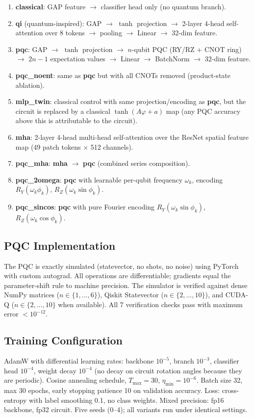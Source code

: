 \documentclass[conference]{IEEEtran}
\begin{document}
\begin{enumerate}
\item \textbf{classical}: GAP feature $\to$ classifier head only (no quantum branch).
\item \textbf{qi} (quantum-inspired): GAP $\to$ $\tanh$ projection $\to$ 2-layer 4-head self-attention over 8 tokens $\to$ pooling $\to$ Linear $\to$ 32-dim feature.
\item \textbf{pqc}: GAP $\to$ $\tanh$ projection $\to$ $n$-qubit PQC (RY/RZ + CNOT ring) $\to$ $2n-1$ expectation values $\to$ Linear $\to$ BatchNorm $\to$ 32-dim feature.
\item \textbf{pqc\_noent}: same as \textbf{pqc} but with all CNOTs removed (product-state ablation).
\item \textbf{mlp\_twin}: classical control with same projection/encoding as \textbf{pqc}, but the circuit is replaced by a classical $\tanh(A\varphi + a)$ map (any PQC accuracy above this is attributable to the circuit).
\item \textbf{mha}: 2-layer 4-head multi-head self-attention over the ResNet spatial feature map (49 patch tokens $\times$ 512 channels).
\item \textbf{pqc\_mha}: \textbf{mha} $\to$ \textbf{pqc} (combined series composition).
\item \textbf{pqc\_2omega}: \textbf{pqc} with learnable per-qubit frequency $\omega_k$, encoding $R_Y(\omega_k \phi_k)$, $R_Z(\omega_k \sin\phi_k)$.
\item \textbf{pqc\_sincos}: \textbf{pqc} with pure Fourier encoding $R_Y(\omega_k \sin\phi_k)$, $R_Z(\omega_k \cos\phi_k)$.
\end{enumerate}

\subsection{PQC Implementation}
The PQC is exactly simulated (statevector, no shots, no noise) using PyTorch with custom autograd. All operations are differentiable; gradients equal the parameter-shift rule to machine precision. The simulator is verified against dense NumPy matrices ($n \in \{1, \ldots, 6\}$), Qiskit Statevector ($n \in \{2, \ldots, 10\}$), and CUDA-Q ($n \in \{2, \ldots, 10\}$ when available). All 7 verification checks pass with maximum error $< 10^{-12}$.

\subsection{Training Configuration}
AdamW with differential learning rates: backbone $10^{-5}$, branch $10^{-3}$, classifier head $10^{-4}$, weight decay $10^{-4}$ (no decay on circuit rotation angles because they are periodic). Cosine annealing schedule, $T_{\max} = 30$, $\eta_{\min} = 10^{-6}$. Batch size 32, max 30 epochs, early stopping patience 10 on validation accuracy. Loss: cross-entropy with label smoothing 0.1, no class weights. Mixed precision: fp16 backbone, fp32 circuit. Five seeds (0--4); all variants run under identical settings.
\end{document}
